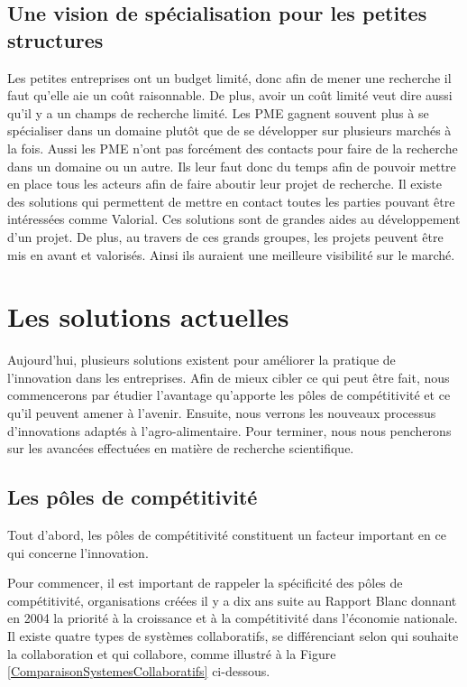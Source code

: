 \documentclass[a4paper,12pt]{report}
\begin{document}
		\subsection{Une vision de spécialisation pour les petites structures}
		
		Les petites entreprises ont un budget limité, donc afin de mener une recherche il faut qu’elle aie un coût raisonnable. De plus, avoir un coût limité veut dire aussi qu’il y a un champs de recherche limité. Les PME gagnent souvent plus à se spécialiser dans un domaine plutôt que de se développer sur plusieurs marchés à la fois. Aussi les PME n’ont pas forcément des contacts pour faire de la recherche dans un domaine ou un autre. Ils leur faut donc du temps afin de pouvoir mettre en place tous les acteurs afin de faire aboutir leur projet de recherche. Il existe des solutions qui permettent de mettre en contact toutes les parties pouvant être intéressées comme Valorial. Ces solutions sont de grandes aides au développement d’un projet. De plus, au travers de ces grands groupes, les projets peuvent être mis en avant et valorisés. Ainsi ils auraient une meilleure visibilité sur le marché. 
	
	\section{Les solutions actuelles}
		Aujourd’hui, plusieurs solutions existent pour améliorer la pratique de l’innovation dans les entreprises. Afin de mieux cibler ce qui peut être fait, nous commencerons par étudier l’avantage qu’apporte les pôles de compétitivité et ce qu’il peuvent amener à l’avenir. Ensuite, nous verrons les nouveaux processus d’innovations adaptés à l’agro-alimentaire. Pour terminer, nous nous pencherons sur les avancées effectuées en matière de recherche scientifique.
		
		\subsection{Les pôles de compétitivité}
		Tout d’abord, les pôles de compétitivité constituent un facteur important en ce qui concerne l’innovation.
		
		Pour commencer, il est important de rappeler la spécificité des pôles de compétitivité, organisations créées il y a dix ans suite au Rapport Blanc donnant en 2004 la priorité à la croissance et à la compétitivité dans l’économie nationale\cite{RapportBlanc}. Il existe quatre types de systèmes collaboratifs, se différenciant selon qui souhaite la collaboration et qui collabore, comme illustré à la Figure  \ref{ComparaisonSystemesCollaboratifs} ci-dessous.
	
\end{document}
